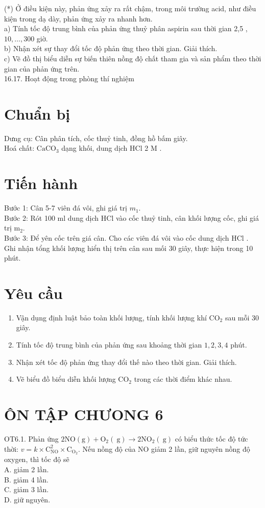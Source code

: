\documentclass[10pt]{article}
\begin{document}
(*) Ở điều kiện này, phản ứng xảy ra rất chậm, trong môi trường acid, như điều kiện trong dạ dày, phản ứng xảy ra nhanh hơn.\\
a) Tính tốc độ trung bình của phản ứng thuỷ phân aspirin sau thời gian 2,5 , $10, \ldots, 300$ giờ.\\
b) Nhận xét sự thay đổi tốc độ phản ứng theo thời gian. Giải thích.\\
c) Vẽ đồ thị biểu diễn sự biến thiên nồng độ chất tham gia và sản phẩm theo thời gian của phản ứng trên.\\
16.17. Hoạt động trong phòng thí nghiệm

\section*{Chuẩn bị}
Dưng cụ: Cân phân tích, cốc thuỷ tinh, đồng hồ bấm giây.\\
Hoá chất: $\mathrm{CaCO}_{3}$ dạng khối, dung dịch HCl 2 M .

\section*{Tiến hành}
Bước 1: Cân 5-7 viên đá vôi, ghi giá trị $m_{1}$.\\
Bước 2: Rót 100 ml dung dịch HCl vào cốc thuỷ tinh, cân khối lượng cốc, ghi giá trị $\mathrm{m}_{2}$.\\
Bước 3: Để yên cốc trên giá cân. Cho các viên đá vôi vào cốc dung dịch HCl . Ghi nhận tổng khối lượng hiển thị trên cân sau mối 30 giây, thực hiện trong 10 phút.

\section*{Yêu cầu}
\begin{enumerate}
  \item Vận dụng định luật bảo toàn khối lượng, tính khối lượng khí $\mathrm{CO}_{2}$ sau mỗi 30 giây.
  \item Tính tốc độ trung bình của phản ứng sau khoảng thời gian $1,2,3,4$ phút.
  \item Nhận xét tốc độ phản ứng thay đổi thế nào theo thời gian. Giải thích.
  \item Vẽ biểu đồ biểu diễn khối lượng $\mathrm{CO}_{2}$ trong các thời điểm khác nhau.
\end{enumerate}

\section*{ÔN TẬP CHƯONG 6}
OT6.1. Phản ứng $2 \mathrm{NO}(\mathrm{g})+\mathrm{O}_{2}(\mathrm{~g}) \rightarrow 2 \mathrm{NO}_{2}(\mathrm{~g})$ có biểu thức tốc độ tức thời: $v=k \times \mathrm{C}_{\mathrm{NO}}^{2} \times \mathrm{C}_{\mathrm{O}_{2}}$. Nếu nồng độ của NO giảm 2 lần, giữ nguyên nồng độ oxygen, thì tốc độ sẽ\\
A. giảm 2 lần.\\
B. giảm 4 lần.\\
C. giảm 3 lần.\\
D. giữ nguyên.
\end{document}
